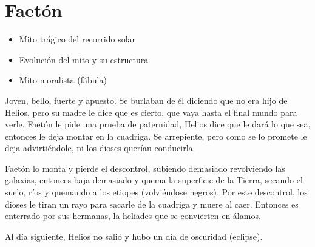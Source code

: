 \section{Faetón}
\begin{itemize}
    \item Mito trágico del recorrido solar
    \item Evolución del mito y su estructura
    \item Mito moralista (fábula)
\end{itemize}
Joven, bello, fuerte y apuesto. Se burlaban de él diciendo que no era hijo de Helios, pero su madre le dice que es cierto, que vaya hasta el final mundo para verle. Faetón le pide una prueba de paternidad, Helios dice que le dará lo que sea, entonces le deja montar en la cuadriga. Se arrepiente, pero como se lo promete le deja advirtiéndole, ni los dioses querían conducirla.

Faetón lo monta y pierde el descontrol, subiendo demasiado revolviendo las galaxias, entonces baja demasiado y quema la superficie de la Tierra, secando el suelo, ríos y quemando a los etiopes (volviéndose negros). Por este descontrol, los dioses le tiran un rayo para sacarle de la cuadriga y muere al caer. Entonces es enterrado por sus hermanas, la heliades  que se convierten en álamos.

Al día siguiente, Helios no salió y hubo un día de oscuridad (eclipse).